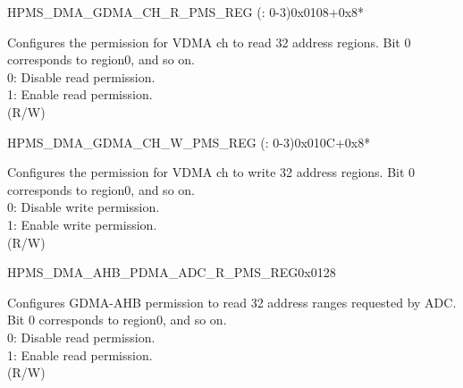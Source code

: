 \begin{register}{H}{PMS\_DMA\_GDMA\_CH\_R\_PMS\_REG (: 0-3)}{0x0108+0x8*}\label{regdesc:PMSDMAGDMACHNRPMSREG}
%
\regnewline%
\begin{regdesc}\begin{reglist}
\label{fielddesc:PMSDMAGDMACHNRPMS}\item [PMS\_DMA\_GDMA\_CH\regindex{n}\_R\_PMS] Configures the permission for VDMA ch to read 32 address regions. Bit 0 corresponds to region0, and so on.\\
0: Disable read permission.\\
1: Enable read permission.\\ (R/W)
\end{reglist}\end{regdesc}
\end{register}


\begin{register}{H}{PMS\_DMA\_GDMA\_CH\_W\_PMS\_REG (: 0-3)}{0x010C+0x8*}\label{regdesc:PMSDMAGDMACHNWPMSREG}
%
\regnewline%
\begin{regdesc}\begin{reglist}
\label{fielddesc:PMSDMAGDMACHNWPMS}\item [PMS\_DMA\_GDMA\_CH\regindex{n}\_W\_PMS] Configures the permission for VDMA ch to write 32 address regions. Bit 0 corresponds to region0, and so on.\\
0: Disable write permission.\\
1: Enable write permission.\\ (R/W)
\end{reglist}\end{regdesc}
\end{register}


\begin{register}{H}{PMS\_DMA\_AHB\_PDMA\_ADC\_R\_PMS\_REG}{0x0128}\label{regdesc:PMSDMAAHBPDMAADCRPMSREG}
%
\regnewline%
\begin{regdesc}\begin{reglist}
\label{fielddesc:PMSDMAAHBPDMAADCRPMS}\item [PMS\_DMA\_AHB\_PDMA\_ADC\_R\_PMS] Configures GDMA-AHB permission to read 32 address ranges requested by ADC. Bit 0 corresponds to region0, and so on.\\
0: Disable read permission.\\
1: Enable read permission.\\ (R/W)
\end{reglist}\end{regdesc}
\end{register}


